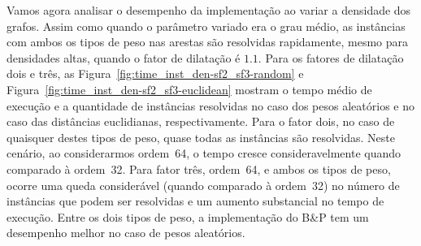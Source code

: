   
     
 

Vamos agora analisar o desempenho da implementação ao variar a densidade
dos grafos. Assim como quando o parâmetro variado era o  grau médio, as
instâncias com ambos os tipos de peso nas arestas são resolvidas rapidamente,
mesmo para densidades altas, quando o fator de dilatação é $\num{1,1}$. Para os
fatores de dilatação dois e três, as
Figura~\ref{fig:time_inst_den-sf2_sf3-random} e
Figura~\ref{fig:time_inst_den-sf2_sf3-euclidean} mostram o tempo
médio de execução e a quantidade de instâncias resolvidas no caso dos
pesos aleatórios e no caso das distâncias euclidianas,
respectivamente. Para o fator dois, no caso de quaisquer destes tipos de peso,
quase todas as instâncias são resolvidas.  Neste cenário, ao
considerarmos ordem~64, o tempo cresce consideravelmente quando comparado
à ordem~32. Para
fator três, ordem~64, e ambos os tipos de peso, ocorre uma queda considerável
(quando comparado à ordem~32) no
número de instâncias que podem ser resolvidas e um aumento substancial
no tempo de execução. Entre os dois tipos de peso, a implementação do B\&P tem
um desempenho melhor no caso de pesos aleatórios.

